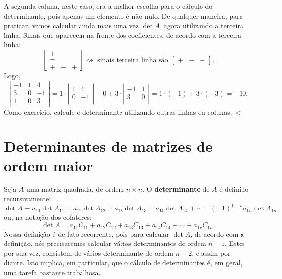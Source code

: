 \documentclass[../livro.tex]{subfiles}  %
\begin{document}
\begin{example}
A segunda coluna, neste caso, era a melhor escolha para o cálculo do determinante, pois apenas um elemento é não nulo. De qualquer maneira, para praticar, vamos calcular ainda mais uma vez $\det A$, agora utilizando a terceira linha. Sinais que aparecem na frente dos coeficientes, de acordo com a terceira linha:
\begin{equation}
\begin{bmatrix}
+ & \,\, & \,\, \\
- & \,\, & \,\, \\
+ &  -   &   +
\end{bmatrix}\rightsquigarrow \text{ sinais terceira linha são }
\begin{bmatrix}
+ & - & + 
\end{bmatrix}.
\end{equation} Logo,
\begin{equation}
\left| 
\begin{matrix}
-1 & 1 & 4 \\
3 & 0 & -1 \\
1 & 0 & 3 \\
\end{matrix}
\right| = 1 \cdot 
\left| 
\begin{matrix}
 1 & 4 \\
 0 & -1 \\
\end{matrix}
\right| - 0 + 3 \cdot
\left| 
\begin{matrix}
-1 & 1 \\
3 & 0  \\
\end{matrix}
\right| = 1 \cdot (-1) + 3 \cdot (-3) = -10.
\end{equation} Como exercício, calcule o determinante utilizando outras linhas ou colunas$. \ \lhd$
\end{example}


\section{Determinantes de matrizes de ordem maior}

Seja $A$ uma matriz quadrada, de ordem $n \times n$. O \textbf{determinante} de $A$ é definido recursivamente:
\begin{equation}\label{defdet}
\boxed{\det A = a_{11} \det A_{11} - a_{12} \det A_{12} +  a_{13} \det A_{13} - a_{14} \det A_{14} + \cdots + (-1)^{1+n}  a_{1n} \det A_{1n}.}
\end{equation} ou, na notação dos cofatores:
\begin{equation}
\boxed{\det A = a_{11} C_{11} + a_{12} C_{12} + a_{13} C_{13} + a_{14} C_{14} + \cdots + a_{1n} C_{1n}.}
\end{equation} Nossa definição é de fato recorrente, pois para calcular $\det A$, de acordo com a definição, nós precisaremos calcular vários determinantes de ordem $n-1$. Estes por sua vez, consistem de vários determinante de ordem $n-2$, e assim por diante. Isto implica, em particular, que o cálculo de determinantes é, em geral, uma tarefa bastante trabalhosa.
\end{document}
